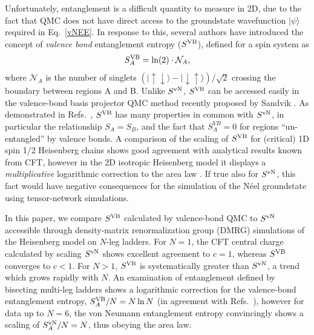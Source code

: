 \documentclass[prl,aps,twocolumn,floatfix,amsmath,amssymb,superscriptaddress,tightenlines]{revtex4}
\begin{document}
Unfortunately, entanglement is a difficult quantity to
measure in 2D, due to the fact that QMC 
does not have
direct access to the groundstate wavefunction $| \psi \rangle$ required
in Eq.~\eqref{vNEE}.  In response to this, several authors \cite{Alet,
Chh} have introduced the concept of {\it valence bond}
entanglement entropy ($S^{\rm VB}$), defined for a  spin system as
\begin{equation} 
S^{\rm VB}_A = \ln(2) \cdot \mathcal{N}_A, \label{VBEE}
\end{equation} 
where $ \mathcal{N}_A$ is the number of singlets
${( |\uparrow \downarrow \rangle - | \downarrow \uparrow
\rangle)/\sqrt{2}}$ crossing the boundary between regions A and B.  Unlike
$S^{ \rm vN}$, $S^{\rm VB}$ can be accessed easily in the valence-bond basis
projector QMC method recently proposed by Sandvik \cite{Sandvik}.  As
demonstrated in Refs.~\cite{Alet,Chh}, $S^{\rm VB}$ has many properties in
common with $S^{ \rm vN}$, in particular the relationship $S_A = S_B$, and the
fact that $S^{VB}_A=0$ for regions ``un-entangled'' by valence bonds.
A comparison of the scaling of $S^{\rm VB}$ for (critical) 1D spin
1/2 Heisenberg chains shows good agreement with analytical results known
from CFT, however in the
 2D isotropic Heisenberg model it
displays a {\it multiplicative} logarithmic correction to the area law \cite{Alet,Chh}.  If
true also for $S^{ \rm vN}$, this fact would have negative consequences for the simulation of the 
N\'eel groundstate using tensor-network simulations.

 
In this paper, we compare $S^{\rm VB}$ calculated by valence-bond QMC to 
$S^{ \rm vN}$ accessible through density-matrix renormalization group
(DMRG) simulations of the Heisenberg model on $N$-leg ladders.    For $N=1$, the CFT central charge calculated  by scaling
$S^{ \rm vN}$ shows excellent agreement to $c=1$, whereas $S^{\rm VB}$ converges
to $c<1$.
For $N>1$, $S^{\rm VB}$ is systematically greater than $S^{ \rm vN}$,
a trend which grows rapidly with $N$. An
examination of entanglement defined by bisecting multi-leg ladders
shows a logarithmic correction for the valence-bond entanglement entropy, $S^{\rm VB}_A /N = N \ln
N$ (in agreement with Refs.~\cite{Alet,Chh}), however for data up to
$N=6$, the von Neumann entanglement entropy  convincingly shows a scaling of
$S^{\rm vN}_A /N = N$, thus obeying the area law.
\end{document}
